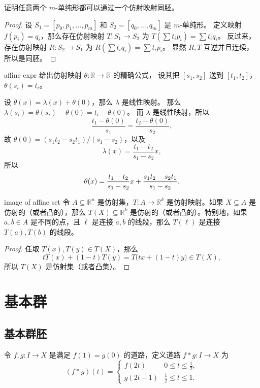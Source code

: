 \documentclass[fontset=none]{Notes}
\begin{document}
\begin{problem}{}{}
  证明任意两个 $m$-单纯形都可以通过一个仿射映射同胚。
\end{problem}
\begin{proof}
  设 $S_1=[p_0,p_1,\dots,p_m]$ 和 $S_2=[q_0,\dots,q_m]$ 是 $m$-单纯形。
  定义映射 $f(p_i)=q_i$，那么存在仿射映射
  $T:S_1\to S_2$ 为 $T(\sum t_ip_i)=\sum t_iq_i$。
  反过来，存在仿射映射 $R:S_2\to S_1$ 为 $R(\sum t_iq_i)=\sum t_ip_i$。
  显然 $R,T$ 互逆并且连续，所以是同胚。
\end{proof}

\begin{problem}{}{affine expr}
  给出仿射映射 $\theta:\mathbb{R}\to \mathbb{R}$ 的精确公式，
  设其把 $[s_1,s_2]$ 送到 $[t_1,t_2]$，$\theta(s_i)=t_i$。
\end{problem}
\begin{solution}
  设 $\theta(x)=\lambda(x)+\theta(0)$，那么 $\lambda$ 是线性映射。
  那么 $\lambda(s_i)=\theta(s_i)-\theta(0)=t_i-\theta(0)$。
  而 $\lambda$ 是线性映射，所以
  \[
    \frac{t_1-\theta(0)}{s_1}=\frac{t_2-\theta(0)}{s_2},
  \]
  故 $\theta(0)=(s_1t_2-s_2t_1)/(s_1-s_2)$，以及
  \[
    \lambda(x)=\frac{t_1-t_2}{s_1-s_2}x,
  \]
  所以
  \[
    \theta(x)=\frac{t_1-t_2}{s_1-s_2}x+\frac{s_1t_2-s_2t_1}{s_1-s_2}.\qedhere
  \]
\end{solution}

\begin{problem}{}{image of affine set}
  令 $A\subseteq \mathbb{R}^n$ 是仿射集，$T:A\to \mathbb{R}^k$
  是仿射映射。如果 $X\subseteq A$ 是仿射的（或者凸的），那么
  $T(X)\subseteq \mathbb{R}^k$ 是仿射的（或者凸的）。特别地，如果 
  $a,b\in A$ 是不同的点，且 $\ell$ 是连接 $a,b$ 的线段，那么
  $T(\ell)$ 是连接 $T(a),T(b)$ 的线段。 
\end{problem}
\begin{proof}
  任取 $T(x),T(y)\in T(X)$，那么
  \[
    tT(x)+(1-t)T(y)=T\bigl(tx+(1-t)y\bigr)\in T(X),
  \]
  所以 $T(X)$ 是仿射集（或者凸集）。
\end{proof}



\chapter{基本群}

\section{基本群胚}

\begin{definition}
  令 $f,g:I\to X$ 是满足 $f(1)=g(0)$ 的道路，定义道路 $f*g:I\to X$
  为
  \[
    (f*g)(t)=\begin{cases}
      f(2t) & 0\leq t\leq\frac{1}{2},\\
      g(2t-1) & \frac{1}{2}\leq t\leq 1.
    \end{cases}
  \]
\end{definition}
\end{document}

